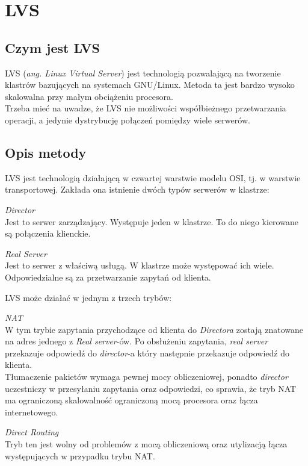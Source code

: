 {\section{LVS}
\label{sec:LVS}
\subsection{Czym jest LVS}
LVS (\textit{ang. Linux Virtual Server}) jest technologią pozwalającą na tworzenie klastrów bazujących na systemach GNU/Linux.
Metoda ta jest bardzo wysoko skalowalna przy małym obciążeniu procesora.\\
Trzeba mieć na uwadze, że LVS nie możliwości współbieżnego przetwarzania operacji, a jedynie dystrybucję połączeń pomiędzy wiele serwerów.
\subsection{Opis metody}
LVS jest technologią działającą w czwartej warstwie modelu OSI, tj. w warstwie transportowej.
Zakłada ona istnienie dwóch typów serwerów w klastrze:
\begin{description}
	\item{\textit{Director}}\\
		Jest to serwer zarządzający. Występuje jeden w klastrze.
		To do niego kierowane są połączenia klienckie.
	\item{\textit{Real Server}}\\
		Jest to serwer z właściwą usługą. W klastrze może występować ich wiele.
		Odpowiedzialne są za przetwarzanie zapytań od klienta.
\end{description}
LVS może działać w jednym z trzech trybów:
\begin{description}
	\item{\textit{NAT}}\\
		W tym trybie zapytania przychodzące od klienta do \textit{Directora} zostają znatowane na adres jednego z \textit{Real server}-ów.
		Po obsłużeniu zapytania, \textit{real server} przekazuje odpowiedź do \textit{director}-a który następnie przekazuje odpowiedź do klienta.\\
		Tłumaczenie pakietów wymaga pewnej mocy obliczeniowej, ponadto \textit{director} uczestniczy w przesyłaniu zapytania oraz odpowiedzi, co sprawia, że tryb NAT ma ograniczoną skalowalność ograniczoną mocą procesora oraz łącza internetowego.
	\item{\textit{Direct Routing}}\\
		Tryb ten jest wolny od problemów z mocą obliczeniową oraz utylizacją łącza występujących w przypadku trybu NAT.\\

\end{description}}
